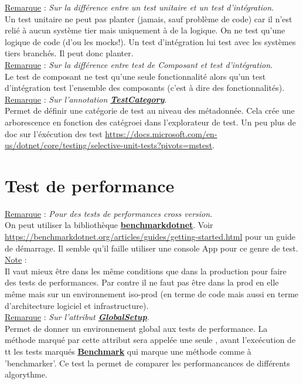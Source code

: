 \documentclass[a4paper,12pt,twoside]{article}
\newcommand{\urlcolor}{magenta}  %
\newcommand{\keycolor}{purple} %
\newcommand{\rem}[2]{\noindent\underline{Remarque} : \textit{#1}.\\ \indent #2}
\newcommand{\note}[1]{\noindent\underline{Note} : \\ \indent #1}
\newcommand{\keyref}[2]{\hypersetup{urlcolor=\keycolor} \href{#1}{\textbf{#2}}\hypersetup{urlcolor=\urlcolor}}
\begin{document}
\rem{Sur la différence entre un test unitaire et un test d'intégration}{Un test unitaire ne peut pas planter (jamais, sauf problème de code) car il n'est relié à aucun système tier mais uniquement à de la logique. On ne test qu'une logique de code (d'ou les mocks!). Un test d'intégration lui test avec les systèmes tiers branchés. Il peut donc planter.}\\

\rem{Sur la différence entre test de Composant et test d'intégration}{Le test de composant ne test qu'une seule fonctionnalité alors qu'un test d'intégration test l'ensemble des composants (c'est à dire des fonctionnalités).}\\

\rem{Sur l'annotation \keyref{https://docs.microsoft.com/en-us/dotnet/api/microsoft.visualstudio.testtools.unittesting.testcategoryattribute?view=visualstudiosdk-2022}{TestCategory}}{Permet de définir une catégorie de test au niveau des métadonnée. Cela crée une arborescence en fonction des catégroei dans l'explorateur de test. Un peu plus de doc sur l'éxécution des test \url{https://docs.microsoft.com/en-us/dotnet/core/testing/selective-unit-tests?pivots=mstest}.}\\

\section{Test de performance}

\rem{Pour des tests de performances cross version}{On peut utiliser la bibliothèque \keyref{https://benchmarkdotnet.org/}{benchmarkdotnet}. Voir \url{https://benchmarkdotnet.org/articles/guides/getting-started.html} pour un guide de démarrage. Il semble qu'il faille utiliser une console App pour ce genre de test.}\\

\note{Il vaut mieux être dans les même conditions que dans la production pour faire des tests de performances. Par contre il ne faut pas être dans la prod en elle même mais sur un environnement iso-prod (en terme de code mais aussi en terme d'architecture logiciel et infrastructure).}\\

\rem{Sur l'attribut \keyref{https://benchmarkdotnet.org/articles/features/setup-and-cleanup.html}{GlobalSetup}}{Permet de donner un environnement global aux tests de performance. La méthode marqué par cette attribut sera appelée une seule , avant l'excécution de tt les tests marqués \keyref{https://benchmarkdotnet.org/articles/features/baselines.html}{Benchmark} qui marque une méthode comme à 'benchmarker'. Ce test la permet de comparer les performancances de différents algorythme.}\\
\end{document}

